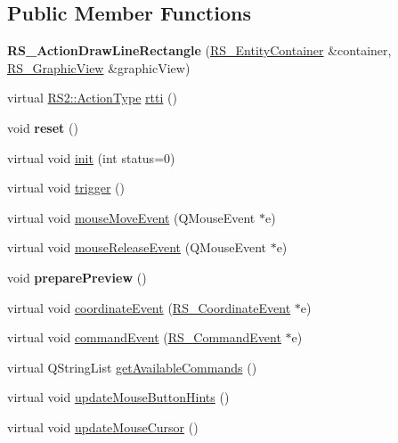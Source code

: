 \subsection*{Public Member Functions}
\begin{DoxyCompactItemize}
\item 
\hypertarget{classRS__ActionDrawLineRectangle_af607d44bf89043918f12f122879e9b72}{{\bfseries R\-S\-\_\-\-Action\-Draw\-Line\-Rectangle} (\hyperlink{classRS__EntityContainer}{R\-S\-\_\-\-Entity\-Container} \&container, \hyperlink{classRS__GraphicView}{R\-S\-\_\-\-Graphic\-View} \&graphic\-View)}\label{classRS__ActionDrawLineRectangle_af607d44bf89043918f12f122879e9b72}

\item 
virtual \hyperlink{classRS2_afe3523e0bc41fd637b892321cfc4b9d7}{R\-S2\-::\-Action\-Type} \hyperlink{classRS__ActionDrawLineRectangle_a85fef502fddf58d5fd187d22afe5d4d7}{rtti} ()
\item 
\hypertarget{classRS__ActionDrawLineRectangle_a4ad31f57219fe764759e2fc6d87eaeee}{void {\bfseries reset} ()}\label{classRS__ActionDrawLineRectangle_a4ad31f57219fe764759e2fc6d87eaeee}

\item 
virtual void \hyperlink{classRS__ActionDrawLineRectangle_af1f87929d1795b929c54ec7792a22ece}{init} (int status=0)
\item 
virtual void \hyperlink{classRS__ActionDrawLineRectangle_ace7368d0513f7c563cb6ebaec92eb3c4}{trigger} ()
\item 
virtual void \hyperlink{classRS__ActionDrawLineRectangle_a87fad1d914075da712920106b329df7f}{mouse\-Move\-Event} (Q\-Mouse\-Event $\ast$e)
\item 
virtual void \hyperlink{classRS__ActionDrawLineRectangle_aa4477965dd610c2879d52b694f0f688c}{mouse\-Release\-Event} (Q\-Mouse\-Event $\ast$e)
\item 
\hypertarget{classRS__ActionDrawLineRectangle_af9c81a6c38a1fed28a3cd595654bb299}{void {\bfseries prepare\-Preview} ()}\label{classRS__ActionDrawLineRectangle_af9c81a6c38a1fed28a3cd595654bb299}

\item 
virtual void \hyperlink{classRS__ActionDrawLineRectangle_a7b76182f552e46628a81f7413887764c}{coordinate\-Event} (\hyperlink{classRS__CoordinateEvent}{R\-S\-\_\-\-Coordinate\-Event} $\ast$e)
\item 
virtual void \hyperlink{classRS__ActionDrawLineRectangle_a8d99e78f920c0ccf90bfdfc7cb69aeac}{command\-Event} (\hyperlink{classRS__CommandEvent}{R\-S\-\_\-\-Command\-Event} $\ast$e)
\item 
virtual Q\-String\-List \hyperlink{classRS__ActionDrawLineRectangle_ac7b007db3b2eeeacfef8bf1eafd0fa77}{get\-Available\-Commands} ()
\item 
virtual void \hyperlink{classRS__ActionDrawLineRectangle_ae02804c51b9f78b275f359edf9b921f6}{update\-Mouse\-Button\-Hints} ()
\item 
virtual void \hyperlink{classRS__ActionDrawLineRectangle_ade1096dd027f711e7b16a2a09cefe593}{update\-Mouse\-Cursor} ()
\end{DoxyCompactItemize}
